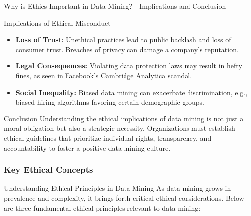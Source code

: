 \documentclass[aspectratio=169]{beamer}
\begin{document}
\begin{frame}[fragile]{Why is Ethics Important in Data Mining? - Implications and Conclusion}
    \begin{block}{Implications of Ethical Misconduct}
        \begin{itemize}
            \item \textbf{Loss of Trust:} Unethical practices lead to public backlash and loss of consumer trust. Breaches of privacy can damage a company's reputation.
            \item \textbf{Legal Consequences:} Violating data protection laws may result in hefty fines, as seen in Facebook's Cambridge Analytica scandal.
            \item \textbf{Social Inequality:} Biased data mining can exacerbate discrimination, e.g., biased hiring algorithms favoring certain demographic groups.
        \end{itemize}
    \end{block}

    \begin{block}{Conclusion}
        Understanding the ethical implications of data mining is not just a moral obligation but also a strategic necessity. Organizations must establish ethical guidelines that prioritize individual rights, transparency, and accountability to foster a positive data mining culture.
    \end{block}
\end{frame}

\begin{frame}[fragile]
    \frametitle{Key Ethical Concepts}
    \begin{block}{Understanding Ethical Principles in Data Mining}
        As data mining grows in prevalence and complexity, it brings forth critical ethical considerations. Below are three fundamental ethical principles relevant to data mining:
    \end{block}
\end{frame}
\end{document}
